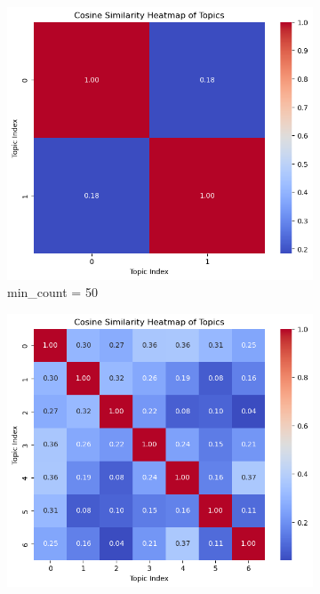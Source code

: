 \begin{figure}[H]
        \centering
        \begin{subfigure}[b]{0.45\textwidth}
            \centering
            \includegraphics[width=\textwidth]{img/3.2acosine_sim_50_ngram_deep.png}
            \caption[min\_count = 50]%
            {{\small min\_count = 50}}    
        \end{subfigure}
        \hfill
        \begin{subfigure}[b]{0.45\textwidth}  
            \centering 
            \includegraphics[width=\textwidth]{img/3.2bcosine_sim_100_ngram_deep.png}

\end{subfigure}
\end{figure}
